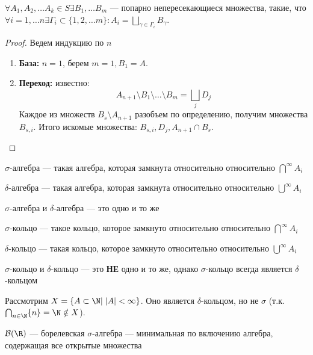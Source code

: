 \begin{proposition}
    \(\forall A_1, A_2, \dots A_k \in S \exists B_1, \dots B_m\) --- попарно непересекающиеся множества, такие, что \(\forall i = 1, \dots n \exists \Gamma_i \subset \{1, 2, \dots m\}: A_i = \bigsqcup_{\gamma \in \Gamma_i}B_\gamma\).
\end{proposition}
\begin{proof}
    Ведем индукцию по \(n\)
    \begin{enumerate}
        \item[] \textbf{База:} \(n = 1\), берем \(m = 1, B_1 = A\).
        \item[] \textbf{Переход:} известно:
        \[A_{n + 1} \setminus B_1 \setminus \dots \setminus B_m = \bigsqcup_j D_j\]
        Каждое из множеств \(B_s \setminus A_{n + 1}\) разобъем по определению, получим множества \(B_{s, i}\). Итого искомые множества: \(B_{s, i}, D_j, A_{n + 1} \cap B_s\).
    \end{enumerate}
\end{proof}

\begin{definition}
    \(\sigma\)-алгебра --- такая алгебра, которая замкнута относительно относительно \(\bigcap^\infty A_i\)
\end{definition}

\begin{definition}
    \(\delta\)-алгебра --- такая алгебра, которая замкнута относительно относительно \(\bigcup^\infty A_i\)
\end{definition}
\begin{note}
    \(\sigma\)-алгебра и \(\delta\)-алгебра --- это одно и то же
\end{note}

\begin{definition}
    \(\sigma\)-кольцо --- такое кольцо, которое замкнуто относительно относительно \(\bigcap^\infty A_i\)
\end{definition}

\begin{definition}
    \(\delta\)-кольцо --- такая кольцо, которое замкнуто относительно относительно \(\bigcup^\infty A_i\)
\end{definition}
\begin{note}
    \(\sigma\)-кольцо и \(\delta\)-кольцо --- это \textbf{НЕ} одно и то же, однако \(\sigma\)-кольцо всегда является \(\delta\)-кольцом
\end{note}
\begin{example}
    Рассмотрим \(X = \{A \subset \N |\;|A| < \infty\}\). Оно является \(\delta\)-кольцом, но не \(\sigma\) (т.к. \(\bigcap_{n \in \N}\{n\} = \N \notin X\)).
\end{example}

\begin{definition}
    \(\mathcal{B}(\R)\) --- борелевская \(\sigma\)-алгебра --- минимальная по включению алгебра, содержащая все открытые множества
\end{definition}
